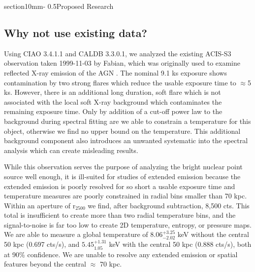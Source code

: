 \documentclass[letterpaper,11pt,twocolumn]{article}
\makeatletter
\renewcommand{\section}{\@startsection%
{section}{1}{0mm}{-\baselineskip}%
{0.5\baselineskip}{\normalfont\Large\bfseries}}%
\makeatother
\begin{document}
\section{Proposed Research}
\subsection{Why not use existing data?}
Using CIAO 3.4.1.1 and CALDB 3.3.0.1, we analyzed the existing ACIS-S3
observation taken 1999-11-03 by Fabian, which was originally used to
examine reflected X-ray emission of the AGN \cite{2001MNRAS.321L..15I}.
The nominal 9.1 ks exposure shows contamination by two strong flares which reduce
the usable exposure time to $\approx$5 ks. However, there is
an additional long duration, soft flare which is not associated with
the local soft X-ray background which contaminates the remaining
exposure time. Only by addition of a cut-off power law to the background
during spectral fitting are we able to constrain a
temperature for this object, otherwise we find no upper bound on the
temperature. This additional background component also introduces an unwanted
systematic into the spectral analysis which can create misleading
results.

While this observation serves the purpose of analyzing the
bright nuclear point source well enough, it is ill-suited for studies
of extended emission because the extended emission is poorly resolved for
so short a usable exposure time and temperature measures are poorly
constrained in radial bins smaller than 70 kpc.
Within an aperture of r$_{2500}$ we find, after
background subtraction, 8,500 cts. This total is insufficient to create
more than two radial temperature bins, and the signal-to-noise is far
too low to create 2D temperature, entropy, or pressure maps. We are able to measure a
global temperature of
$8.06^{+3.25}_{-2.02}$ keV without the central 50 kpc (0.697 cts/s), and
$5.45^{+1.31}_{1.05}$ keV with the central 50 kpc (0.888 cts/s), both at 90\%
confidence. We are unable to resolve any extended emission or spatial
features beyond the central $\approx$ 70 kpc.
\end{document}
